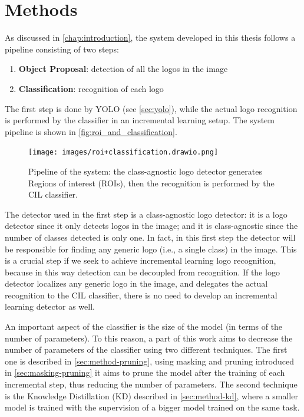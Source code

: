 \chapter{Methods}
\label{chap:methods}

As discussed in \autoref{chap:introduction}, the system developed in this thesis follows a pipeline consisting of two steps:
\begin{enumerate}
    \item \textbf{Object Proposal}: detection of all the logos in the image
    \item \textbf{Classification}: recognition of each logo
\end{enumerate}
The first step is done by YOLO (see \autoref{sec:yolo}), while the actual logo recognition is performed by the classifier in an incremental learning setup. The system pipeline is shown in \autoref{fig:roi_and_classification}.

\begin{figure}%
	\centering

    \begin{center}
        \texttt{[image: images/roi+classification.drawio.png]}
    \end{center}

	\caption{Pipeline of the system: the class-agnostic logo detector generates Regions of interest (ROIs), then the recognition is performed by the CIL classifier.}%
	\label{fig:roi_and_classification}%
\end{figure}

The detector used in the first step is a class-agnostic logo detector: it is a logo detector since it only detects logos in the image; and it is class-agnostic since the number of classes detected is only one. In fact, in this first step the detector will be responsible for finding any generic logo (i.e., a single class) in the image. This is a crucial step if we seek to achieve incremental learning logo recognition, because in this way detection can be decoupled from recognition. If the logo detector localizes any generic logo in the image, and delegates the actual recognition to the CIL classifier, there is no need to develop an incremental learning detector as well.

An important aspect of the classifier is the size of the model (in terms of the number of parameters). To this reason, a part of this work aims to decrease the number of parameters of the classifier using two different techniques. The first one is described in \autoref{sec:method-pruning}, using masking and pruning introduced in \autoref{sec:masking-pruning} it aims to prune the model after the training of each incremental step, thus reducing the number of parameters. The second technique is the Knowledge Distillation (KD) described in \autoref{sec:method-kd}, where a smaller model is trained with the supervision of a bigger model trained on the same task.

